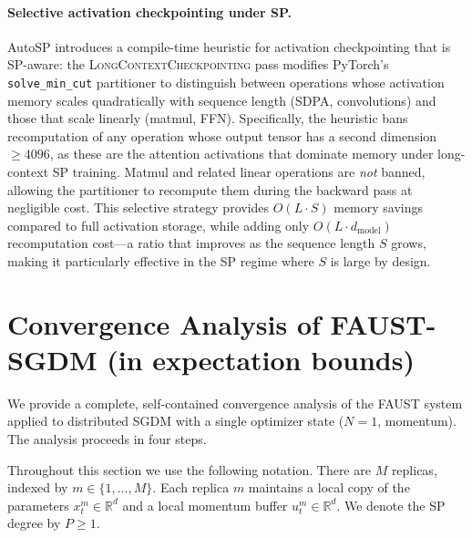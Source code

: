 \documentclass{article}
\begin{document}
\paragraph{Selective activation checkpointing under SP.}
AutoSP introduces a compile-time heuristic for activation checkpointing that
is SP-aware: the \textsc{LongContextCheckpointing} pass modifies PyTorch's
\texttt{solve\_min\_cut} partitioner to distinguish between operations whose
activation memory scales quadratically with sequence length (SDPA, convolutions)
and those that scale linearly (matmul, FFN).
Specifically, the heuristic bans recomputation of any operation whose output
tensor has a second dimension $\geq 4096$, as these are the attention
activations that dominate memory under long-context SP training.
Matmul and related linear operations are \emph{not} banned, allowing the
partitioner to recompute them during the backward pass at negligible cost.
This selective strategy provides $O(L \cdot S)$ memory savings compared to
full activation storage, while adding only $O(L \cdot d_{\text{model}})$ recomputation
cost---a ratio that improves as the sequence length $S$ grows, making it
particularly effective in the SP regime where $S$ is large by design.


\section{Convergence Analysis of FAUST-SGDM (in expectation bounds)}
\label{sec:sgdm_proof}

We provide a complete, self-contained convergence analysis of the FAUST
system applied to distributed SGDM with a single optimizer state ($N=1$,
momentum). The analysis proceeds in four steps.

Throughout this section we use the following notation.
There are $M$ replicas, indexed by $m \in \{1, \ldots, M\}$.
Each replica $m$ maintains a local copy of the parameters $x_t^m \in \mathbb{R}^d$
and a local momentum buffer $u_t^m \in \mathbb{R}^d$.
We denote the SP degree by $P \geq 1$.
\end{document}
